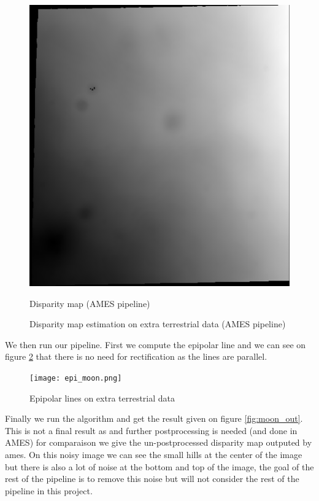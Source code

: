 \documentclass[10pt,twocolumn,letterpaper]{article}
\begin{document}
\begin{figure}
\begin{minipage}[t]{0.23\textwidth}
    \centerline{\includegraphics[width=\textwidth]{ames_out.png}}
    \centerline{Disparity map (AMES pipeline)}
    \end{minipage}
    \caption{Disparity map estimation on extra terrestrial data (AMES pipeline)}
    \label{fig:moon}
\end{figure}
We then run our pipeline. First we compute the epipolar line and we can see on figure \ref{fig:moon_epi} that there is no need for rectification as the lines are parallel.
\begin{figure}
    \centering
    \texttt{[image: epi\_moon.png]}
    \caption{Epipolar lines on extra terrestrial data}
    \label{fig:moon_epi}
\end{figure}
Finally we run the algorithm and get the result given on figure \ref{fig:moon_out}. This is not a final result as and further postprocessing is needed (and done in AMES) for comparaison we give the un-postprocessed disparity map outputed by ames. On this noisy image we can see the small hills at the center of the image but there is also a lot of noise at the bottom and top of the image, the goal of the rest of the pipeline is to remove this noise but will not consider the rest of the pipeline in this project.
\end{document}
